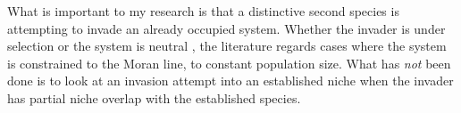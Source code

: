 What is important to my research is that a distinctive second species is attempting to invade an already occupied system. 
Whether the invader is under selection \cite{Kimura1955} or the system is neutral \cite{Crow1956,Hubbell2001}, the literature regards cases where the system is constrained to the Moran line, to constant population size. %
What has \emph{not} been done is to look at an invasion attempt into an established niche when the invader has partial niche overlap with the established species. 

